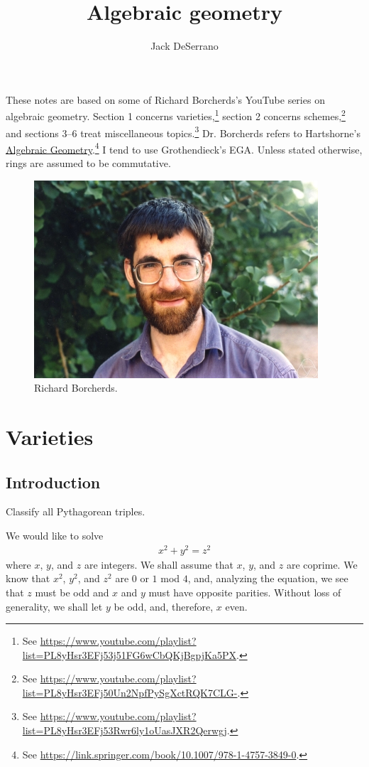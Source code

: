 \documentclass [11 pt, oneside, margin = 1 in] {article}
\title {Algebraic geometry}
\author {Jack DeSerrano}
\begin{document}
\ifams
    \vspace*{\fill}
\fi
\maketitle
These notes are based on some of Richard Borcherds's YouTube series on algebraic geometry. Section 1 concerns varieties,\footnote{See \url{https://www.youtube.com/playlist?list=PL8yHsr3EFj53j51FG6wCbQKjBgpjKa5PX}.} section 2 concerns schemes,\footnote{See \url{https://www.youtube.com/playlist?list=PL8yHsr3EFj50Un2NpfPySgXctRQK7CLG-}.} and sections 3--6 treat miscellaneous topics.\footnote{See \url{https://www.youtube.com/playlist?list=PL8yHsr3EFj53Rwr6ly1oUasJXR2Qerwgj}.} Dr. Borcherds refers to Hartshorne's \underline{Algebraic Geometry}.\footnote{See \url{https://link.springer.com/book/10.1007/978-1-4757-3849-0}.} I tend to use Grothendieck's EGA. Unless stated otherwise, rings are assumed to be commutative.
\tableofcontents
\ifams
	\vspace*{\fill}
\fi


\begin{figure}
\begin{center}
\includegraphics[scale=0.8]{images/borcherds}
\caption{Richard Borcherds.}
\end{center}
\end{figure}
\text{}
\newpage


\section{Varieties}

\subsection{Introduction}
\begin{problem}
	Classify all Pythagorean triples.
\end{problem}
We would like to solve
\begin{align*}
	x^2 + y^2 = z^2
\end{align*}
where $x$, $y$, and $z$ are integers. We shall assume that $x$, $y$, and $z$ are coprime. We know that $x^2$, $y^2$, and $z^2$ are $0$ or $1$ mod $4$, and, analyzing the equation, we see that $z$ must be odd and $x$ and $y$ must have opposite parities. Without loss of generality, we shall let $y$ be odd, and, therefore, $x$ even.
\end{document}
